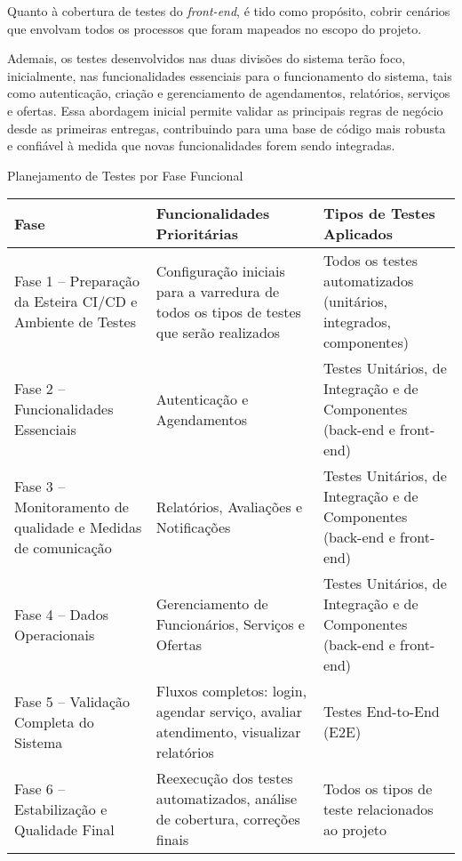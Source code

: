 Quanto à cobertura de testes do \textit{front-end}, é tido como propósito, cobrir cenários que envolvam todos os processos que foram mapeados no escopo do projeto.

Ademais, os testes desenvolvidos nas duas divisões do sistema terão foco, inicialmente, nas funcionalidades essenciais para o funcionamento do sistema, tais como autenticação, criação e gerenciamento de agendamentos, relatórios, serviços e ofertas. Essa abordagem inicial permite validar as principais regras de negócio desde as primeiras entregas, contribuindo para uma base de código mais robusta e confiável à medida que novas funcionalidades forem sendo integradas.

\begin{quadro}[htbp]
	\centering
	\caption{Planejamento de Testes por Fase Funcional}
	\label{quad:planejamento-testes}
	\begin{tabularx}{\textwidth}{|p{5cm}|X|X|}
		\hline
		\textbf{Fase} & 
		\textbf{Funcionalidades Prioritárias} & 
		\textbf{Tipos de Testes Aplicados} \\
		\hline
		Fase 1 – Preparação da Esteira CI/CD e Ambiente de Testes & 
		Configuração iniciais para a varredura de todos os tipos de testes que serão realizados &
		Todos os testes automatizados (unitários, integrados, componentes)
		\\
		\hline
		Fase 2 – Funcionalidades Essenciais & 
		Autenticação e Agendamentos & 
		Testes Unitários, de Integração e de Componentes (back-end e front-end) \\
		\hline
		Fase 3 – Monitoramento de qualidade e Medidas de comunicação & 
		Relatórios, Avaliações e Notificações & 
		Testes Unitários, de Integração e de Componentes (back-end e front-end) \\
		\hline
		Fase 4 – Dados Operacionais & 
		Gerenciamento de Funcionários, Serviços e Ofertas & 
		Testes Unitários, de Integração e de Componentes (back-end e front-end) \\
		\hline
		Fase 5 – Validação Completa do Sistema & 
		Fluxos completos: login, agendar serviço, avaliar atendimento, visualizar relatórios & 
		Testes End-to-End (E2E) \\
		\hline
		Fase 6 – Estabilização e Qualidade Final & 
		Reexecução dos testes automatizados, análise de cobertura, correções finais & 
		Todos os tipos de teste relacionados ao projeto \\
		\hline
	\end{tabularx}
\end{quadro}


